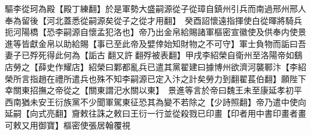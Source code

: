 驅李從珂為殿【殿丁練翻】於是軍勢大盛嗣源從子從璋自鎮州引兵而南過邢州邢人奉為留後【河北蓋悉從嗣源矣從子之從才用翻】　癸酉詔懷遠指揮使白從暉將騎兵扼河陽橋【恐李嗣源自懷孟犯洛也】帝乃出金帛給賜諸軍樞密宣徽使及供奉内使景進等皆獻金帛以助給賜【事已至此帝及嬖倖始知財物之不可守】軍士負物而詬曰吾妻子已殍死得此何為【詬古翻又許翻殍被表翻】甲戌李紹榮自衛州至洛陽帝如鷂店勞之【薛史作耀店】紹榮曰鄴都亂兵已遣其黨翟建曰據博州欲濟河襲鄆汴【李紹榮所言指趙在禮所遣兵也殊不知李嗣源已定入汴之計矣勞力到翻翟萇伯翻】願陛下幸關東招撫之帝從之【關東謂汜水關以東】　景進等言於帝曰魏王未至康延孝初平西南猶未安王衍族黨不少聞軍駕東征恐其為變不若除之【少詩照翻】帝乃遣中使向延嗣【向式亮翻】齎敕往誅之敕曰王衍一行並從殺戮已印畫【印者用中書印畫者畫可敕又用御寶】樞密使張居翰覆視